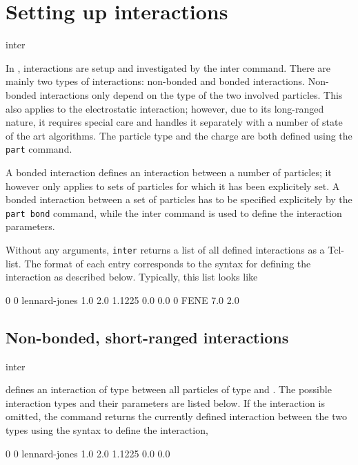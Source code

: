 \chapter{Setting up interactions}
\label{sec:inter}

\begin{essyntax}
  inter
\end{essyntax}

In \es, interactions are setup and investigated by the inter command. There are
mainly two types of interactions: non-bonded and bonded interactions. Non-bonded
interactions only depend on the type of the two involved particles. This also
applies to the electrostatic interaction; however, due to its long-ranged
nature, it requires special care and \es{} handles it separately with a number
of state of the art algorithms. The particle type and the charge are both
defined using the {\tt part} command.

A bonded interaction defines an interaction between a number of particles; it
however only applies to sets of particles for which it has been explicitely set.
A bonded interaction between a set of particles has to be specified explicitely
by the {\tt part bond} command, while the inter command is used to define the
interaction parameters.

Without any arguments, {\tt inter} returns a list of all defined interactions as
a Tcl-list. The format of each entry corresponds to the syntax for defining the
interaction as described below. Typically, this list looks like
\begin{tclcode}
  {0 0 lennard-jones 1.0 2.0 1.1225 0.0 0.0} {0 FENE 7.0 2.0}
\end{tclcode}

\section{Non-bonded, short-ranged interactions}
\label{sec:inter-nb}

\begin{essyntax}
  inter  
\end{essyntax}
defines an interaction of type  between all particles of type
 and . The possible interaction types and their parameters
are listed below. If the interaction is omitted, the command returns the
currently defined interaction between the two types using the syntax to define
the interaction, \eg
\begin{tclcode}
  0 0 lennard-jones 1.0 2.0 1.1225 0.0 0.0
\end{tclcode}


